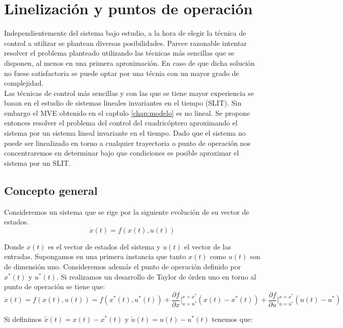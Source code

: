 \documentclass[main]{subfiles}
\begin{document}
\chapter{Linelizaci\'on y puntos de operaci\'on}
\label{chap:linealizacion}

Independientemente del sistema bajo estudio, a la hora de elegir la t\'ecnica de control a utilizar se plantean diversas posibilidades. Parece razonable intentar resolver el problema planteado utilizando las t\'ecnicas m\'as sencillas que se disponen, al menos en una primera aproximaci\'on. En caso de que dicha soluci\'on no fuese satisfactoria se puede optar por una t\'ecnia con un mayor grado de complejidad.\\ 

Las t\'ecnicas de control m\'as sencillas y con las que se tiene mayor experiencia se basan en el estudio de sistemas lineales invariantes en el tiempo (SLIT). Sin embargo el MVE obtenido en el cap\'tulo \ref{chap:modelo} es no lineal. Se propone entonces resolver el problema del control del cuadric\'optero aproximando el sistema por un sistema lineal invariante en el tiempo. Dado que el sistema no puede ser linealizado en torno a cualquier trayectoria o punto de operaci\'on nos concentraremos en determinar bajo que condiciones es posible aproximar el sistema por un SLIT.

\section{Concepto general}
Consideremos un sistema que se rige por la siguiente evoluci\'on de su vector de estados. 
\begin{equation}
\dot{x}(t)=f(x(t),u(t))
\end{equation}

Donde $x(t)$ es el vector de estados del sistema y $u(t)$ el vector de las entradas. Supongamos en una primera instancia que tanto $x(t)$ como $u(t)$ son de dimensi\'on uno. Consideremos adem\'as el punto de operaci\'on definido por $x^*(t)$ y $u^*(t)$. Si realizamos un desarrollo de Taylor de \'orden uno en torno al punto de operaci\'on se tiene que:
\begin{equation}
\dot{x}(t)=f(x(t),u(t))=f(x^*(t),u^*(t))+\frac{\partial f}{\partial x}\vert_{u=u^*}^{x=x^*}(x(t)-x^*(t))+\frac{\partial f}{\partial u}\vert_{u=u^*}^{x=x^*}(u(t)-u^*)
\end{equation}

Si definimos $\tilde{x}(t)=x(t)-x^*(t)$ y $\tilde{u}(t)=u(t)-u^*(t)$ tenemos que:
\end{document}
